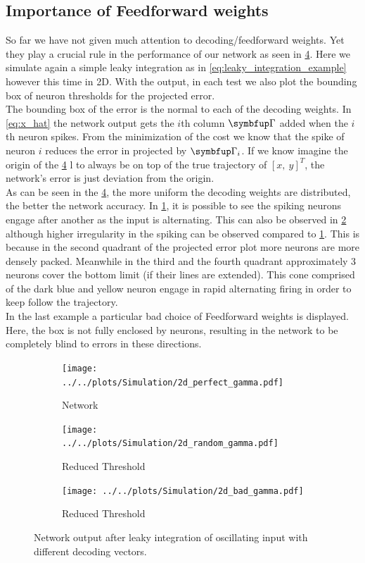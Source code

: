 \subsection{Importance of Feedforward weights}
So far we have not given much attention to decoding/feedforward weights. Yet they play a crucial rule in the performance of our network as seen in \cref{fig:sim_res_3}. Here we simulate again a simple leaky integration as in \cref{eq:leaky_integration_example} however this time in 2D. With the output, in each test we also plot the bounding box of neuron thresholds for the projected error.\\
The bounding box of the error is the normal to each of the decoding weights. In \cref{eq:x_hat} the network output gets the $i$th column $\bmu{\Gamma}$ added when the $i$th neuron spikes. From the minimization of the cost we know that the spike of neuron $i$ reduces the error in projected by $\bmu{\Gamma}_i$. If we know imagine the origin of the \cref{fig:sim_res_3} l to always be on top of the true trajectory of $\left[x ,\ y\right]^T$, the network's error is just deviation from the origin.\\
As can be seen in the \cref{fig:sim_res_3}, the more uniform the decoding weights are distributed, the better the network accuracy. In \cref{fig:sim_perfect_gamma}, it is possible to see the spiking neurons engage after another as the input is alternating. This can also be observed in \cref{fig:sim_random_gamma} although higher irregularity in the spiking can be observed compared to \cref{fig:sim_perfect_gamma}. This is because in the second quadrant of the projected error plot more neurons are more densely packed. Meanwhile in the third and the fourth quadrant approximately 3 neurons cover the bottom limit (if their lines are extended). This cone comprised of the dark blue and yellow neuron engage in rapid alternating firing in order to keep follow the trajectory.\\
In the last example a particular bad choice of Feedforward weights is displayed. Here, the box is not fully enclosed by neurons, resulting in the network to be completely blind to errors in these directions.
\begin{figure}[h!]
		\centering
	\begin{subfigure}[t]{0.6\textwidth}
		\centering
		\texttt{[image: ../../plots/Simulation/2d\_perfect\_gamma.pdf]}
		\caption{Network }
		\label{fig:sim_perfect_gamma}
	\end{subfigure}
	\hfill
	\begin{subfigure}[t]{0.6\textwidth}
		\centering
		\texttt{[image: ../../plots/Simulation/2d\_random\_gamma.pdf]}
		\caption{Reduced Threshold}
		\label{fig:sim_random_gamma}
	\end{subfigure}
	\hfill
\begin{subfigure}[t]{0.6\textwidth}
	\centering
	\texttt{[image: ../../plots/Simulation/2d\_bad\_gamma.pdf]}
	\caption{Reduced Threshold}
	\label{fig:sim_bad_gamma}
\end{subfigure}
	\caption{Network output after leaky integration of oscillating input with different decoding vectors.}
	\label{fig:sim_res_3}
\end{figure}


